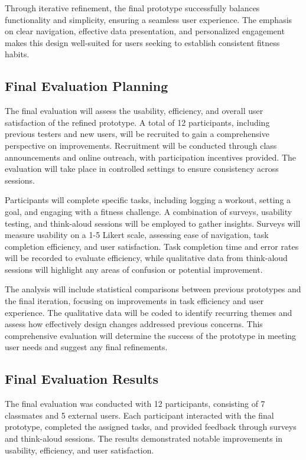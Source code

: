 \documentclass[
	letterpaper, %
]{jdf}
\begin{document}
Through iterative refinement, the final prototype successfully balances functionality and simplicity, ensuring a seamless user experience. The emphasis on clear navigation, effective data presentation, and personalized engagement makes this design well-suited for users seeking to establish consistent fitness habits.

\subsection{Final Evaluation Planning}
The final evaluation will assess the usability, efficiency, and overall user satisfaction of the refined prototype. A total of 12 participants, including previous testers and new users, will be recruited to gain a comprehensive perspective on improvements. Recruitment will be conducted through class announcements and online outreach, with participation incentives provided. The evaluation will take place in controlled settings to ensure consistency across sessions.

Participants will complete specific tasks, including logging a workout, setting a goal, and engaging with a fitness challenge. A combination of surveys, usability testing, and think-aloud sessions will be employed to gather insights. Surveys will measure usability on a 1-5 Likert scale, assessing ease of navigation, task completion efficiency, and user satisfaction. Task completion time and error rates will be recorded to evaluate efficiency, while qualitative data from think-aloud sessions will highlight any areas of confusion or potential improvement.

The analysis will include statistical comparisons between previous prototypes and the final iteration, focusing on improvements in task efficiency and user experience. The qualitative data will be coded to identify recurring themes and assess how effectively design changes addressed previous concerns. This comprehensive evaluation will determine the success of the prototype in meeting user needs and suggest any final refinements.

\subsection{Final Evaluation Results}
The final evaluation was conducted with 12 participants, consisting of 7 classmates and 5 external users. Each participant interacted with the final prototype, completed the assigned tasks, and provided feedback through surveys and think-aloud sessions. The results demonstrated notable improvements in usability, efficiency, and user satisfaction.
\end{document}
